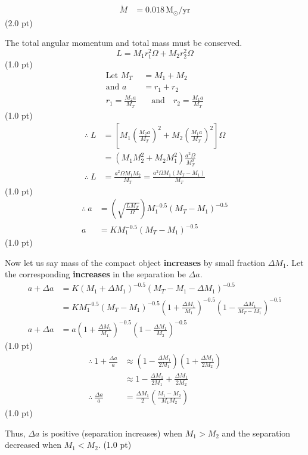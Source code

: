 \begin{description}
\begin{align*}
    \dot{M} &= 0.018\,\mathrm{M}_\odot/\mathrm{yr}
  \end{align*}
  \hfill(2.0 pt)
\item[(f)] The total angular momentum and total mass must be conserved.
  \[ L = M_1 r_1^2 \Omega + M_2 r_2^2 \Omega \]
  \hfill(1.0 pt)
  \begin{align*}
    \text{Let } M_T &= M_1 + M_2\\
    \text{and } a &= r_1 + r_2\\
    r_1 = \frac{M_2 a}{M_T} &\quad\text{and}\quad r_2 = \frac{M_1 a}{M_T}
  \end{align*}
  \hfill(1.0 pt)
  \begin{align*}
    \therefore\ L &= \left[M_1\left(\frac{M_2 a}{M_T}\right)^2
      + M_2\left(\frac{M_1 a}{M_T}\right)^2\right]\Omega\\
    &= \left(M_1 M_2^2 + M_2 M_1^2\right)\frac{a^2\Omega}{M_T^2}\\
    \therefore\ L &= \frac{a^2\Omega M_1 M_2}{M_T}
      = \frac{a^2\Omega M_1 (M_T - M_1)}{M_T}
  \end{align*}
  \hfill(1.0 pt)
  \begin{align*}
    \therefore\ a &= \left(\sqrt{\frac{L M_T}{\Omega}}\right)
      M_1^{-0.5}(M_T - M_1)^{-0.5}\\
    a &= K M_1^{-0.5}(M_T - M_1)^{-0.5}
  \end{align*}
  \hfill(1.0 pt)

  Now let us say mass of the compact object \textbf{increases} by small
  fraction $\Delta M_1$. Let the corresponding \textbf{increases} in the
  separation be $\Delta a$.
  \begin{align*}
    a + \Delta a &= K(M_1 + \Delta M_1)^{-0.5}
      (M_T - M_1 - \Delta M_1)^{-0.5}\\
    &= K M_1^{-0.5}(M_T - M_1)^{-0.5}
      \left(1 + \frac{\Delta M_1}{M_1}\right)^{-0.5}
      \left(1 - \frac{\Delta M_1}{M_T - M_1}\right)^{-0.5}\\
    a + \Delta a &= a\left(1 + \frac{\Delta M_1}{M_1}\right)^{-0.5}
      \left(1 - \frac{\Delta M_1}{M_2}\right)^{-0.5}
  \end{align*}
  \hfill(1.0 pt)
  \begin{align*}
    \therefore\ 1 + \frac{\Delta a}{a}
      &\approx \left(1 - \frac{\Delta M_1}{2M_1}\right)
        \left(1 + \frac{\Delta M_1}{2M_2}\right)\\
    &\approx 1 - \frac{\Delta M_1}{2M_1} + \frac{\Delta M_1}{2M_2}\\
    \therefore\ \frac{\Delta a}{a}
      &= \frac{\Delta M_1}{2}\left(\frac{M_1 - M_2}{M_1 M_2}\right)
  \end{align*}
  \hfill(1.0 pt)

  Thus, $\Delta a$ is positive (separation increases) when $M_1 > M_2$ and
  the separation decreased when $M_1 < M_2$. \hfill(1.0 pt)
\end{description}

